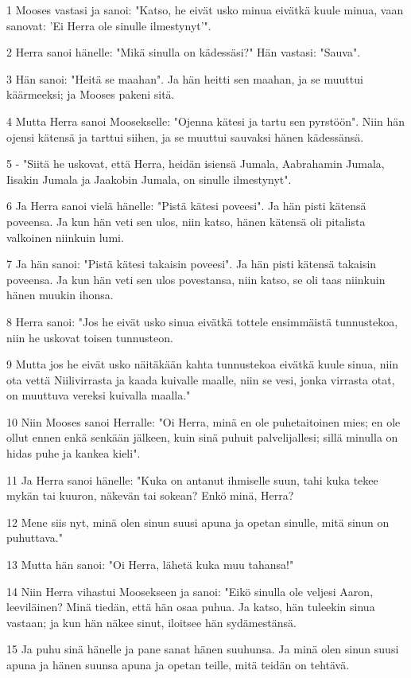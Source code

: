 \par 1 Mooses vastasi ja sanoi: "Katso, he eivät usko minua eivätkä kuule minua, vaan sanovat: 'Ei Herra ole sinulle ilmestynyt'".
\par 2 Herra sanoi hänelle: "Mikä sinulla on kädessäsi?" Hän vastasi: "Sauva".
\par 3 Hän sanoi: "Heitä se maahan". Ja hän heitti sen maahan, ja se muuttui käärmeeksi; ja Mooses pakeni sitä.
\par 4 Mutta Herra sanoi Moosekselle: "Ojenna kätesi ja tartu sen pyrstöön". Niin hän ojensi kätensä ja tarttui siihen, ja se muuttui sauvaksi hänen kädessänsä.
\par 5 - "Siitä he uskovat, että Herra, heidän isiensä Jumala, Aabrahamin Jumala, Iisakin Jumala ja Jaakobin Jumala, on sinulle ilmestynyt".
\par 6 Ja Herra sanoi vielä hänelle: "Pistä kätesi poveesi". Ja hän pisti kätensä poveensa. Ja kun hän veti sen ulos, niin katso, hänen kätensä oli pitalista valkoinen niinkuin lumi.
\par 7 Ja hän sanoi: "Pistä kätesi takaisin poveesi". Ja hän pisti kätensä takaisin poveensa. Ja kun hän veti sen ulos povestansa, niin katso, se oli taas niinkuin hänen muukin ihonsa.
\par 8 Herra sanoi: "Jos he eivät usko sinua eivätkä tottele ensimmäistä tunnustekoa, niin he uskovat toisen tunnusteon.
\par 9 Mutta jos he eivät usko näitäkään kahta tunnustekoa eivätkä kuule sinua, niin ota vettä Niilivirrasta ja kaada kuivalle maalle, niin se vesi, jonka virrasta otat, on muuttuva vereksi kuivalla maalla."
\par 10 Niin Mooses sanoi Herralle: "Oi Herra, minä en ole puhetaitoinen mies; en ole ollut ennen enkä senkään jälkeen, kuin sinä puhuit palvelijallesi; sillä minulla on hidas puhe ja kankea kieli".
\par 11 Ja Herra sanoi hänelle: "Kuka on antanut ihmiselle suun, tahi kuka tekee mykän tai kuuron, näkevän tai sokean? Enkö minä, Herra?
\par 12 Mene siis nyt, minä olen sinun suusi apuna ja opetan sinulle, mitä sinun on puhuttava."
\par 13 Mutta hän sanoi: "Oi Herra, lähetä kuka muu tahansa!"
\par 14 Niin Herra vihastui Moosekseen ja sanoi: "Eikö sinulla ole veljesi Aaron, leeviläinen? Minä tiedän, että hän osaa puhua. Ja katso, hän tuleekin sinua vastaan; ja kun hän näkee sinut, iloitsee hän sydämestänsä.
\par 15 Ja puhu sinä hänelle ja pane sanat hänen suuhunsa. Ja minä olen sinun suusi apuna ja hänen suunsa apuna ja opetan teille, mitä teidän on tehtävä.
